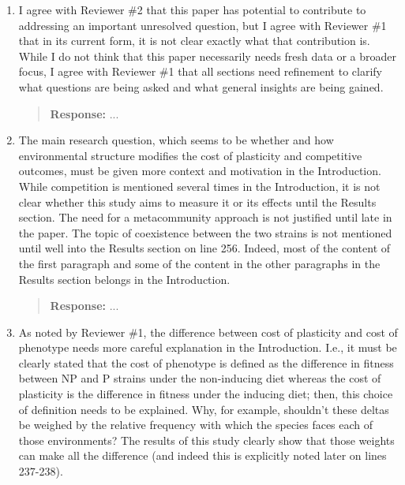\documentclass[letterpaper,11pt]{article}
\begin{document}
\begin{enumerate}[label=E.\arabic*, ref=(E.\arabic*)]

\item I agree with Reviewer \#2 that this paper has potential to contribute to addressing an important unresolved question, but I agree with Reviewer \#1 that in its current form, it is not clear exactly what that contribution is. While I do not think that this paper necessarily needs fresh data or a broader focus, I agree with Reviewer \#1 that all sections need refinement to clarify what questions are being asked and what general insights are being gained. 

\begin{quote}
\textbf{Response:} ...
\end{quote}

\item The main research question, which seems to be whether and how environmental structure modifies the cost of plasticity and competitive outcomes, must be given more context and motivation in the Introduction. While competition is mentioned several times in the Introduction, it is not clear whether this study aims to measure it or its effects until the Results section. The need for a metacommunity approach is not justified until late in the paper. The topic of coexistence between the two strains is not mentioned until well into the Results section on line 256. Indeed, most of the content of the first paragraph and some of the content in the other paragraphs in the Results section belongs in the Introduction.

\begin{quote}
\textbf{Response:} ...
\end{quote}

\item As noted by Reviewer \#1, the difference between cost of plasticity and cost of phenotype needs more careful explanation in the Introduction. I.e., it must be clearly stated that the cost of phenotype is defined as the difference in fitness between NP and P strains under the non-inducing diet whereas the cost of plasticity is the difference in fitness under the inducing diet; then, this choice of definition needs to be explained. Why, for example, shouldn’t these deltas be weighed by the relative frequency with which the species faces each of those environments? The results of this study clearly show that those weights can make all the difference (and indeed this is explicitly noted later on lines 237-238).


\end{enumerate}
\end{document}
